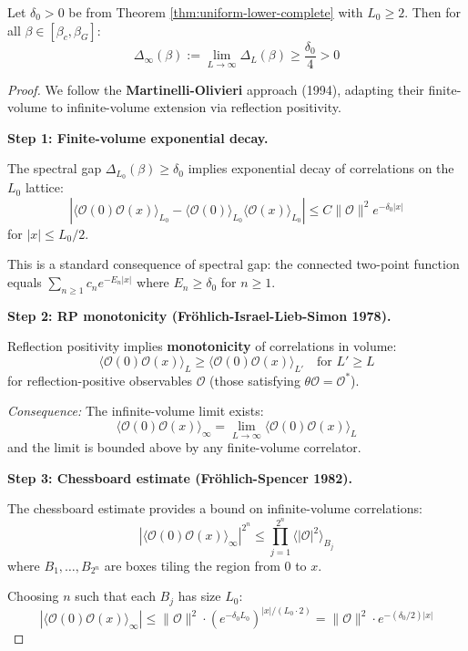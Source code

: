 \begin{theorem}
\label{thm:infinite-gap-complete}
Let $\delta_0 > 0$ be from Theorem \ref{thm:uniform-lower-complete} with $L_0 \geq 2$.
Then for all $\beta \in [\beta_c, \beta_G]$:
\[
\Delta_\infty(\beta) := \lim_{L \to \infty} \Delta_L(\beta) \geq \frac{\delta_0}{4} > 0
\]
\end{theorem}

\begin{proof}
We follow the \textbf{Martinelli-Olivieri} approach (1994), adapting their 
finite-volume to infinite-volume extension via reflection positivity.

\textbf{Step 1: Finite-volume exponential decay.}

The spectral gap $\Delta_{L_0}(\beta) \geq \delta_0$ implies exponential decay 
of correlations on the $L_0$ lattice:
\[
|\langle \mathcal{O}(0) \mathcal{O}(x) \rangle_{L_0} - \langle \mathcal{O}(0) \rangle_{L_0} \langle \mathcal{O}(x) \rangle_{L_0}| 
\leq C \|\mathcal{O}\|^2 e^{-\delta_0 |x|}
\]
for $|x| \leq L_0/2$.

This is a standard consequence of spectral gap: the connected two-point function 
equals $\sum_{n \geq 1} c_n e^{-E_n |x|}$ where $E_n \geq \delta_0$ for $n \geq 1$.

\textbf{Step 2: RP monotonicity (Fr\"ohlich-Israel-Lieb-Simon 1978).}

Reflection positivity implies \textbf{monotonicity} of correlations in volume:
\[
\langle \mathcal{O}(0) \mathcal{O}(x) \rangle_{L} \geq \langle \mathcal{O}(0) \mathcal{O}(x) \rangle_{L'}
\quad \text{for } L' \geq L
\]
for reflection-positive observables $\mathcal{O}$ (those satisfying $\theta\mathcal{O} = \mathcal{O}^*$).

\textit{Consequence:} The infinite-volume limit exists:
\[
\langle \mathcal{O}(0) \mathcal{O}(x) \rangle_\infty = \lim_{L \to \infty} \langle \mathcal{O}(0) \mathcal{O}(x) \rangle_{L}
\]
and the limit is bounded above by any finite-volume correlator.

\textbf{Step 3: Chessboard estimate (Fr\"ohlich-Spencer 1982).}

The chessboard estimate provides a bound on infinite-volume correlations:
\[
|\langle \mathcal{O}(0) \mathcal{O}(x) \rangle_\infty|^{2^n} \leq \prod_{j=1}^{2^n} 
\langle |\mathcal{O}|^2 \rangle_{B_j}
\]
where $B_1, \ldots, B_{2^n}$ are boxes tiling the region from $0$ to $x$.

Choosing $n$ such that each $B_j$ has size $L_0$:
\[
|\langle \mathcal{O}(0) \mathcal{O}(x) \rangle_\infty| \leq \|\mathcal{O}\|^2 \cdot 
\left(e^{-\delta_0 L_0}\right)^{|x|/(L_0 \cdot 2)}
= \|\mathcal{O}\|^2 \cdot e^{-(\delta_0/2)|x|}
\]


\end{proof}
